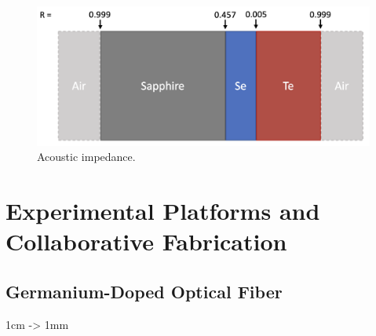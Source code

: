 \begin{figure}[t]
  \centering
  \includegraphics[width=\textwidth]{figs/4-Raman/AcousticImpedance.png}
  \caption{Acoustic impedance.}
  \label{fig:Raman:AcousticImpedance}
\end{figure}


\section{Experimental Platforms and Collaborative Fabrication}
\label{sec:Raman:ExperimentalPlatformsandCollaborativeFabrication}

\subsection{Germanium-Doped Optical Fiber}
\label{subsec:Raman:Target:UHNA3}

1cm -> 1mm


